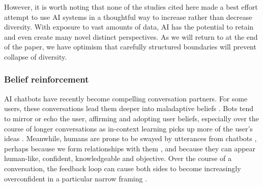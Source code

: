 \documentclass[11pt]{article}
\begin{document}

However, it is worth noting that none of the studies cited here made a best effort attempt to use AI systems in a thoughtful way to increase rather than decrease diversity. With exposure to vast amounts of data, AI has the potential to retain and even create many novel distinct perspectives. As we will return to at the end of the paper, we have optimism that carefully structured boundaries will prevent collapse of diversity.






\subsubsection{Belief reinforcement} 

AI chatbots have recently become compelling conversation partners. For some users, these conversations lead them deeper into maladaptive beliefs \citep{tiku2025psychosis, morrin2025delusions, ostergaard2025generative, yeung2025psychogenic}. Bots tend to mirror or echo the user, affirming and adopting user beliefs, especially over the course of longer conversations as in-context learning picks up more of the user's ideas \citep{shanahan2023role, perez2022discovering, sharma2023sycophancy, weilnhammer2026vulnerability, cheng2026sycophantic}. Meanwhile, humans are prone to be swayed by utterances from chatbots \citep{costello2024durably, luettgau2025people, potter2024hidden}, perhaps because we form relationships with them \citep{kirk2025human}, and because they can appear human-like, confident, knowledgeable and objective. Over the course of a conversation, the feedback loop can cause both sides to become increasingly overconfident in a particular narrow framing \citep{dohnany2026technological}. 
\end{document}
